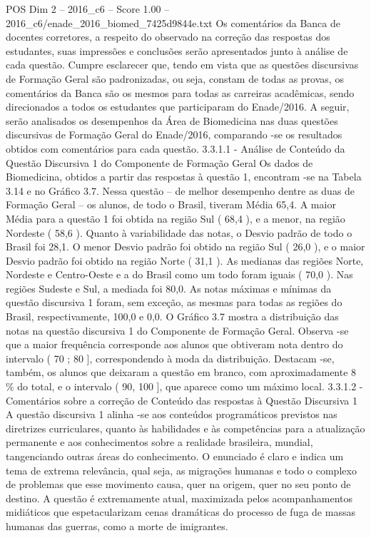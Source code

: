 \begin{textsample}{POS Dim 2 – 2016\_c6 – Score 1.00 – 2016\_c6/enade\_2016\_biomed\_7425d9844e.txt}
Os comentários da Banca de docentes corretores, a respeito do observado na correção das respostas dos estudantes, suas impressões e conclusões serão apresentados junto à análise de cada questão.
Cumpre esclarecer que, tendo em vista que as questões discursivas de Formação Geral são padronizadas, ou seja, constam de todas as provas, os comentários da Banca são os mesmos para todas as carreiras acadêmicas, sendo direcionados a todos os estudantes que participaram do Enade/2016.
A seguir, serão analisados os desempenhos da Área de Biomedicina nas duas questões discursivas de Formação Geral do Enade/2016, comparando -se os resultados obtidos com comentários para cada questão. 3.3.1.1 - Análise de Conteúdo da Questão Discursiva 1 do Componente de Formação Geral Os dados de Biomedicina, obtidos a partir das respostas à questão 1, encontram -se na Tabela 3.14 e no Gráfico 3.7.
Nessa questão – de melhor desempenho dentre as duas de Formação Geral – os alunos, de todo o Brasil, tiveram Média 65,4.
A maior Média para a questão 1 foi obtida na região Sul ( 68,4 ), e a menor, na região Nordeste ( 58,6 ).
Quanto à variabilidade das notas, o Desvio padrão de todo o Brasil foi 28,1.
O menor Desvio padrão foi obtido na região Sul ( 26,0 ), e o maior Desvio padrão foi obtido na região Norte ( 31,1 ).
As medianas das regiões Norte, Nordeste e Centro-Oeste e a do Brasil como um todo foram iguais ( 70,0 ).
Nas regiões Sudeste e Sul, a mediada foi 80,0.
As notas máximas e mínimas da questão discursiva 1 foram, sem exceção, as mesmas para todas as regiões do Brasil, respectivamente, 100,0 e 0,0.
O Gráfico 3.7 mostra a distribuição das notas na questão discursiva 1 do Componente de Formação Geral.
Observa -se que a maior frequência corresponde aos alunos que obtiveram nota dentro do intervalo ( 70 ; 80 ], correspondendo à moda da distribuição.
Destacam -se, também, os alunos que deixaram a questão em branco, com aproximadamente 8 \% do total, e o intervalo ( 90, 100 ], que aparece como um máximo local. 3.3.1.2 - Comentários sobre a correção de Conteúdo das respostas à Questão Discursiva 1 A questão discursiva 1 alinha -se aos conteúdos programáticos previstos nas diretrizes curriculares, quanto às habilidades e às competências para a atualização permanente e aos conhecimentos sobre a realidade brasileira, mundial, tangenciando outras áreas do conhecimento.
O enunciado é claro e indica um tema de extrema relevância, qual seja, as migrações humanas e todo o complexo de problemas que esse movimento causa, quer na origem, quer no seu ponto de destino.
A questão é extremamente atual, maximizada pelos acompanhamentos midiáticos que espetacularizam cenas dramáticas do processo de fuga de massas humanas das guerras, como a morte de imigrantes.

\end{textsample}
